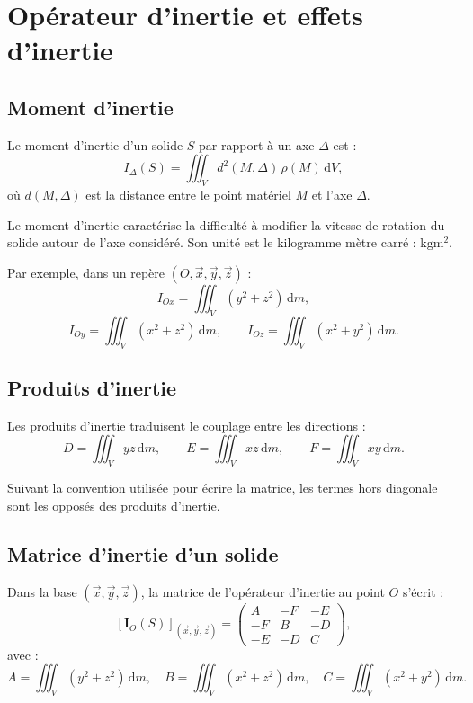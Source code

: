 \section{Opérateur d'inertie et effets d'inertie}
\label{sec:am-9}

\subsection{Moment d'inertie}

Le moment d'inertie d'un solide $S$ par rapport à un axe $\Delta$ est :
\[
I_\Delta(S)=\iiint_V d^2(M,\Delta)\,\rho(M)\,\mathrm dV,
\]
où $d(M,\Delta)$ est la distance entre le point matériel $M$ et l'axe $\Delta$.

Le moment d'inertie caractérise la difficulté à modifier la vitesse de rotation du solide autour de l'axe considéré. Son unité est le kilogramme mètre carré : $\si{\kilogram\metre\squared}$.

Par exemple, dans un repère $(O,\vec x,\vec y,\vec z)$ :
\[
I_{Ox}=\iiint_V (y^2+z^2)\,\mathrm dm,
\]
\[
I_{Oy}=\iiint_V (x^2+z^2)\,\mathrm dm,
\qquad
I_{Oz}=\iiint_V (x^2+y^2)\,\mathrm dm.
\]

\subsection{Produits d'inertie}

Les produits d'inertie traduisent le couplage entre les directions :
\[
D=\iiint_V yz\,\mathrm dm,
\qquad
E=\iiint_V xz\,\mathrm dm,
\qquad
F=\iiint_V xy\,\mathrm dm.
\]

Suivant la convention utilisée pour écrire la matrice, les termes hors diagonale sont les opposés des produits d'inertie.

\subsection{Matrice d'inertie d'un solide}

Dans la base $(\vec x,\vec y,\vec z)$, la matrice de l'opérateur d'inertie au point $O$ s'écrit :
\[
\left[\mathbf I_O(S)\right]_{(\vec x,\vec y,\vec z)}=
\begin{pmatrix}
A & -F & -E\\
-F & B & -D\\
-E & -D & C
\end{pmatrix},
\]
avec :
\[
A=\iiint_V (y^2+z^2)\,\mathrm dm,
\quad
B=\iiint_V (x^2+z^2)\,\mathrm dm,
\quad
C=\iiint_V (x^2+y^2)\,\mathrm dm.
\]

